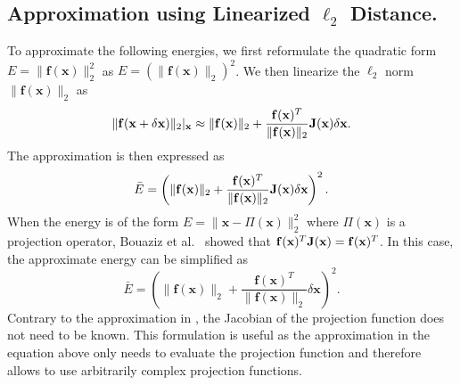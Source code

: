 \subsection{Approximation using Linearized $\ell_2$ Distance.}
\label{app:lindistance}
To approximate the following energies, we first reformulate the quadratic form $E = \|\mathbf{f}(\mathbf{x})\|_2^2$ as $E = (\|\mathbf{f}(\mathbf{x})\|_2)^2$. We then linearize the $\ell_2$ norm $\|\mathbf{f}(\mathbf{x})\|_2$ as
\begin{equation*}
\|\mathbf{f}(\mathbf{x}+\delta\mathbf{x})\|_2|_{\mathbf{x}} \approx \|\mathbf{f}(\mathbf{x})\|_2 + \frac{\mathbf{f}(\mathbf{x})^T}{\|\mathbf{f}(\mathbf{x})\|_2}\mathbf{J}(\mathbf{x})\delta\mathbf{x}.
\end{equation*}
The approximation is then expressed as 
\begin{equation*}
\bar{E} = \left( \|\mathbf{f}(\mathbf{x})\|_2 + \frac{\mathbf{f}(\mathbf{x})^T}{\|\mathbf{f}(\mathbf{x})\|_2}\mathbf{J}(\mathbf{x})\delta\mathbf{x} \right)^2.
\end{equation*}
When the energy is of the form $E = \|\mathbf{x} - \Pi(\mathbf{x})\|_2^2$ where $\Pi(\mathbf{x})$ is a projection operator, Bouaziz et al.~\cite{Bouaziz_sgp12} showed that $\mathbf{f}(\mathbf{x})^T\mathbf{J}(\mathbf{x}) = \mathbf{f}(\mathbf{x})^T$. In this case, the approximate energy can be simplified as 
\begin{equation*}
\label{eq:linproj}
\bar{E} = \left( \|\mathbf{f}(\mathbf{x})\|_2 + \frac{\mathbf{f}(\mathbf{x})^T}{\|\mathbf{f}(\mathbf{x})\|_2}\delta\mathbf{x} \right)^2.
\end{equation*}
Contrary to the approximation in , the Jacobian of the projection function does not need to be known. This formulation is useful as the approximation in the equation above 
only needs to evaluate the projection function and therefore allows to use arbitrarily complex projection functions.
% 
